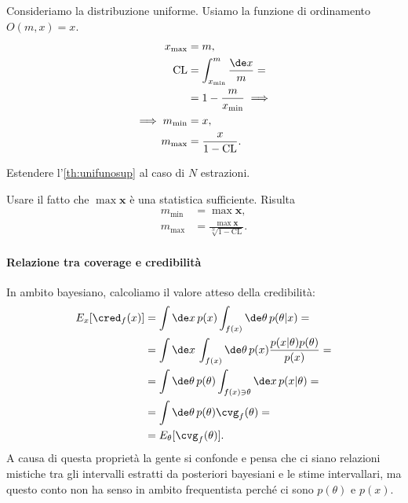 \begin{example}
	\label{th:unifunosup}
	Consideriamo la distribuzione uniforme.
	Usiamo la funzione di ordinamento $O(m,x)=x$.
	\begin{align*}
		x_\mathrm{max}
		&= m, \\
		\mathrm{CL}
		&= \int_{x_\mathrm{min}}^m \frac{\de x}{m} = \\
		&= 1 - \frac m{x_\mathrm{min}} \implies \\
		\implies m_\mathrm{min}
		&= x, \\
		m_\mathrm{max}
		&= \frac x{1-\mathrm{CL}}.
	\end{align*}
\end{example}

\begin{exercise}
	\label{th:unifsup}
	Estendere l'\autoref{th:unifunosup} al caso di $N$ estrazioni.
\end{exercise}

\begin{solution}
	Usare il fatto che $\max \mathbf x$ è una statistica sufficiente.
	Risulta
	\begin{align*}
		m_\mathrm{min}
		&= \max\mathbf x, \\
		m_\mathrm{max}
		&= \frac{\max\mathbf x}{\sqrt[N]{1-\mathrm{CL}}}.
	\end{align*}
\end{solution}

\paragraph{Relazione tra coverage e credibilità}

In ambito bayesiano, calcoliamo il valore atteso della credibilità:
\begin{align*}
	E_x[\cred_f(x)]
	&= \int \de x\, p(x)
	\int_{f(x)} \de\theta\, p(\theta|x) = \\
	&= \int \de x\, \int_{f(x)} \de\theta\,
	p(x) \frac{p(x|\theta) p(\theta)}{p(x)} = \\
	&= \int \de \theta\, p(\theta)
	\int_{f(x)\ni\theta} \de x\, p(x|\theta) = \\
	&= \int \de \theta\, p(\theta) \cvg_f(\theta) = \\
	&= E_\theta[\cvg_f(\theta)].
\end{align*}
A causa di questa proprietà la gente si confonde e pensa che ci siano relazioni mistiche tra gli intervalli estratti da posteriori bayesiani e le stime intervallari,
ma questo conto non ha senso in ambito frequentista perché ci sono $p(\theta)$ e $p(x)$.

